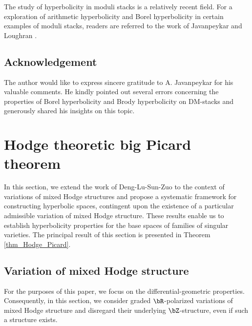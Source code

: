 \documentclass[11pt,letterpaper]{amsart}
\numberwithin{equation}{section}
\begin{document}
	The study of hyperbolicity in moduli stacks is a relatively recent field. For a exploration of arithmetic hyperbolicity and Borel hyperbolicity in certain examples of moduli stacks, readers are referred to the work of Javanpeykar and Loughran \cite{Javanpeykar2021}.
    \subsection{Acknowledgement}
	The author would like to express sincere gratitude to A. Javanpeykar for his valuable comments. He kindly pointed out several errors concerning the properties of Borel hyperbolicity and Brody hyperbolicity on DM-stacks and generously shared his insights on this topic.

	\section{Hodge theoretic big Picard theorem}
	In this section, we extend the work of Deng-Lu-Sun-Zuo \cite{DLSZ} to the context of variations of mixed Hodge structures and propose a systematic framework for constructing hyperbolic spaces, contingent upon the existence of a particular admissible variation of mixed Hodge structure. These results enable us to establish hyperbolicity properties for the base spaces of families of singular varieties. The principal result of this section is presented in Theorem \ref{thm_Hodge_Picard}.
	\subsection{Variation of mixed Hodge structure}
	For the purposes of this paper, we focus on the differential-geometric properties. Consequently, in this section, we consider graded $\bR$-polarized variations of mixed Hodge structure and disregard their underlying $\bZ$-structure, even if such a structure exists.
	
\end{document}
